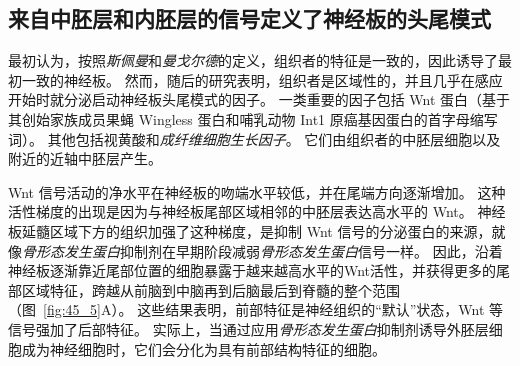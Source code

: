 \subsection{来自中胚层和内胚层的信号定义了神经板的头尾模式}

最初认为，按照\textit{斯佩曼}和\textit{曼戈尔德}的定义，组织者的特征是一致的，因此诱导了最初一致的神经板。
然而，随后的研究表明，组织者是区域性的，并且几乎在感应开始时就分泌启动神经板头尾模式的因子。
一类重要的因子包括 Wnt 蛋白（基于其创始家族成员果蝇 Wingless 蛋白和哺乳动物 Int1 原癌基因蛋白的首字母缩写词）。
其他包括视黄酸和\textit{成纤维细胞生长因子}。
它们由组织者的中胚层细胞以及附近的近轴中胚层产生。


Wnt 信号活动的净水平在神经板的吻端水平较低，并在尾端方向逐渐增加。
这种活性梯度的出现是因为与神经板尾部区域相邻的中胚层表达高水平的 Wnt。
神经板延髓区域下方的组织加强了这种梯度，是抑制 Wnt 信号的分泌蛋白的来源，就像\textit{骨形态发生蛋白}抑制剂在早期阶段减弱\textit{骨形态发生蛋白}信号一样。
因此，沿着神经板逐渐靠近尾部位置的细胞暴露于越来越高水平的Wnt活性，并获得更多的尾部区域特征，跨越从前脑到中脑再到后脑最后到脊髓的整个范围（图~\ref{fig:45_5}A）。
这些结果表明，前部特征是神经组织的“默认”状态，Wnt 等信号强加了后部特征。
实际上，当通过应用\textit{骨形态发生蛋白}抑制剂诱导外胚层细胞成为神经细胞时，它们会分化为具有前部结构特征的细胞。


